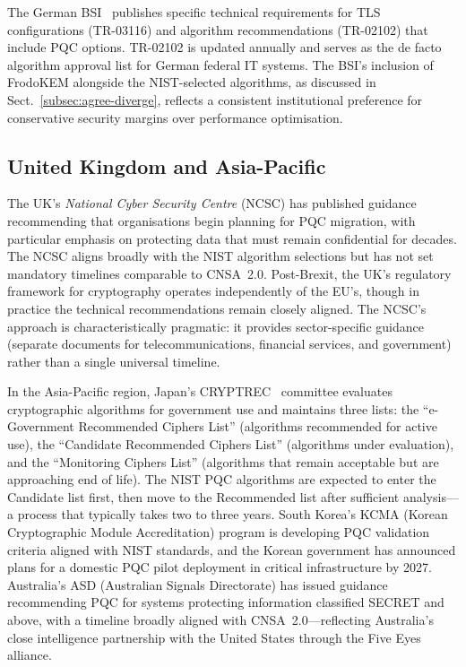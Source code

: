 The German BSI~\cite{BSI-TR-02102,BSI-TR-03116} publishes specific technical requirements for TLS configurations (TR-03116) and algorithm recommendations (TR-02102) that include PQC options. TR-02102 is updated annually and serves as the de facto algorithm approval list for German federal IT systems. The BSI's inclusion of FrodoKEM alongside the NIST-selected algorithms, as discussed in Sect.~\ref{subsec:agree-diverge}, reflects a consistent institutional preference for conservative security margins over performance optimisation.

\subsection{United Kingdom and Asia-Pacific}
\label{subsec:uk-apac}

The UK's \emph{National Cyber Security Centre} (NCSC) has published guidance recommending that organisations begin planning for PQC migration, with particular emphasis on protecting data that must remain confidential for decades. The NCSC aligns broadly with the NIST algorithm selections but has not set mandatory timelines comparable to CNSA~2.0. Post-Brexit, the UK's regulatory framework for cryptography operates independently of the EU's, though in practice the technical recommendations remain closely aligned. The NCSC's approach is characteristically pragmatic: it provides sector-specific guidance (separate documents for telecommunications, financial services, and government) rather than a single universal timeline.

In the Asia-Pacific region, Japan's CRYPTREC~\cite{CRYPTREC2023} committee evaluates cryptographic algorithms for government use and maintains three lists: the ``e-Government Recommended Ciphers List'' (algorithms recommended for active use), the ``Candidate Recommended Ciphers List'' (algorithms under evaluation), and the ``Monitoring Ciphers List'' (algorithms that remain acceptable but are approaching end of life). The NIST PQC algorithms are expected to enter the Candidate list first, then move to the Recommended list after sufficient analysis---a process that typically takes two to three years. South Korea's KCMA (Korean Cryptographic Module Accreditation) program is developing PQC validation criteria aligned with NIST standards, and the Korean government has announced plans for a domestic PQC pilot deployment in critical infrastructure by 2027. Australia's ASD (Australian Signals Directorate) has issued guidance recommending PQC for systems protecting information classified SECRET and above, with a timeline broadly aligned with CNSA~2.0---reflecting Australia's close intelligence partnership with the United States through the Five Eyes alliance.


